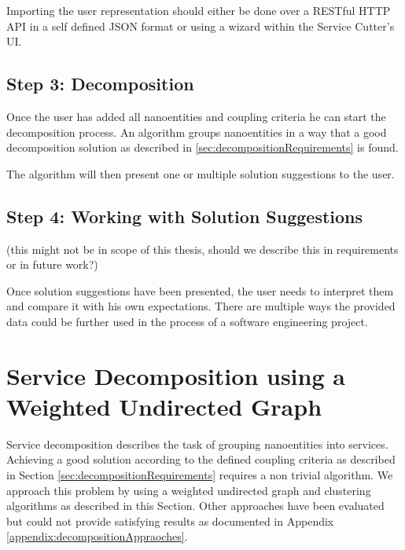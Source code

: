 Importing the user representation should either be done over a RESTful HTTP API in a self defined JSON format or using a wizard within the Service Cutter's \gls{UI}.

\subsection{Step 3: Decomposition}

Once the user has added all nanoentities and coupling criteria he can start the decomposition process. An algorithm groups nanoentities in a way that a good decomposition solution as described in \ref{sec:decompositionRequirements} is found. 

The algorithm will then present one or multiple solution suggestions to the user.

\subsection{Step 4: Working with Solution Suggestions}

(this might not be in scope of this thesis, should we describe this in requirements or in future work?) %

Once solution suggestions have been presented, the user needs to interpret them and compare it with his own expectations. There are multiple ways the provided data could be further used in the process of a software engineering project.


\section{Service Decomposition using a Weighted Undirected Graph}
\label{subsec:approach1_graph}

Service decomposition describes the task of grouping nanoentities into services. Achieving a good solution according to the defined coupling criteria as described in Section \ref{sec:decompositionRequirements} requires a non trivial algorithm. We approach this problem by using a weighted undirected graph and clustering algorithms as described in this Section. Other approaches have been evaluated but could not provide satisfying results as documented in Appendix \ref{appendix:decompositionAppraoches}.

